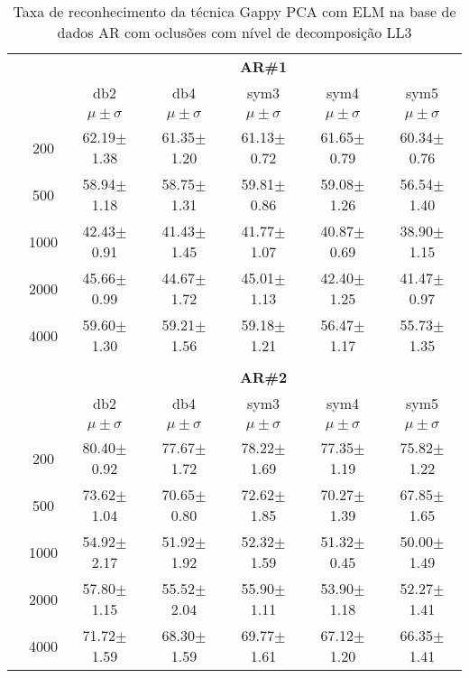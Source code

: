 \begin{table}[H]
	\centering
    \normalsize
	\caption{Taxa de reconhecimento da técnica Gappy PCA com ELM na base de dados AR com oclusões com nível de decomposição LL3}
	\begin{tabular}{|c|c|c c c c c|}
\cline{3-7}
\multicolumn{2}{c|}{\multirow{3}{*}{}} & \multicolumn{5}{c|}{\textbf{AR\#1}}   \\\cline{3-7} 
\multicolumn{2}{c|}{}  & db2 & db4 & sym3 & sym4 & sym5 \\\cline{3-7}%
\multicolumn{2}{c|}{}& $\mu \pm \sigma$ & $\mu \pm \sigma$ & $\mu \pm \sigma$ & $\mu \pm \sigma$ & $\mu \pm \sigma$ \\\hline


\multicolumn{1}{|c|}{ \multirow{5}{*}{\rotatebox[origin=c]{90}{\textbf{Neurônios}}} }
&200	&62.19$\pm$1.38	&61.35$\pm$1.20	&61.13$\pm$0.72	&61.65$\pm$0.79	&60.34$\pm$0.76	\\\cline{2-7}
&500	&58.94$\pm$1.18	&58.75$\pm$1.31	&59.81$\pm$0.86	&59.08$\pm$1.26	&56.54$\pm$1.40	\\\cline{2-7}
&1000	&42.43$\pm$0.91	&41.43$\pm$1.45	&41.77$\pm$1.07	&40.87$\pm$0.69	&38.90$\pm$1.15	\\\cline{2-7}
&2000	&45.66$\pm$0.99	&44.67$\pm$1.72	&45.01$\pm$1.13	&42.40$\pm$1.25	&41.47$\pm$0.97	\\\cline{2-7}
&4000	&59.60$\pm$1.30	&59.21$\pm$1.56	&59.18$\pm$1.21	&56.47$\pm$1.17	&55.73$\pm$1.35	


\\\midrule%

\multicolumn{7}{c}{}\\ 

\cline{3-7}
\multicolumn{2}{c|}{\multirow{3}{*}{}} & \multicolumn{5}{c|}{\textbf{AR\#2}}   \\\cline{3-7} 

\multicolumn{2}{c|}{}  & db2 & db4 & sym3 & sym4 & sym5 \\\cline{3-7}
\multicolumn{2}{c|}{}& $\mu \pm \sigma$ & $\mu \pm \sigma$ & $\mu \pm \sigma$ & $\mu \pm \sigma$ & $\mu \pm \sigma$ \\\hline


\multicolumn{1}{|c|}{ \multirow{5}{*}{\rotatebox[origin=c]{90}{\textbf{Neurônios}}} }
&200	&80.40$\pm$0.92	&77.67$\pm$1.72	&78.22$\pm$1.69	&77.35$\pm$1.19	&75.82$\pm$1.22	\\\cline{2-7}
&500	&73.62$\pm$1.04	&70.65$\pm$0.80	&72.62$\pm$1.85	&70.27$\pm$1.39	&67.85$\pm$1.65	\\\cline{2-7}
&1000	&54.92$\pm$2.17	&51.92$\pm$1.92	&52.32$\pm$1.59	&51.32$\pm$0.45	&50.00$\pm$1.49	\\\cline{2-7}
&2000	&57.80$\pm$1.15 &55.52$\pm$2.04	&55.90$\pm$1.11	&53.90$\pm$1.18	&52.27$\pm$1.41	\\\cline{2-7}
&4000	&71.72$\pm$1.59	&68.30$\pm$1.59	&69.77$\pm$1.61	&67.12$\pm$1.20	&66.35$\pm$1.41	



\end{tabular}
\end{table}
